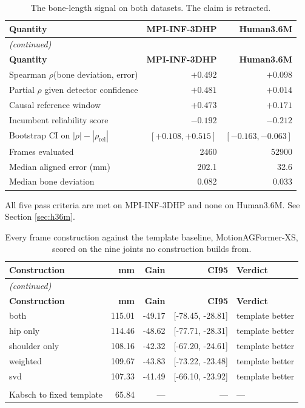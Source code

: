 \begin{center}
{\fontsize{10}{12}\selectfont
\begin{longtable}{lrr}
\caption{The bone-length signal on both datasets. The claim is retracted.}\label{tab:appbone}\\
\hline
\textbf{Quantity} & \textbf{MPI-INF-3DHP} & \textbf{Human3.6M} \\
\hline
\endfirsthead
\multicolumn{3}{l}{\textit{(continued)}}\\
\hline
\textbf{Quantity} & \textbf{MPI-INF-3DHP} & \textbf{Human3.6M} \\
\hline
\endhead
\hline
\endfoot
Spearman $\rho$(bone deviation, error) & $+0.492$ & $+0.098$ \\
Partial $\rho$ given detector confidence & $+0.481$ & $+0.014$ \\
Causal reference window & $+0.473$ & $+0.171$ \\
Incumbent reliability score & $-0.192$ & $-0.212$ \\
Bootstrap CI on $|\rho|-|\rho_{\mathrm{rel}}|$ & $[+0.108, +0.515]$ & $[-0.163, -0.063]$ \\
Frames evaluated & 2460 & 52900 \\
Median aligned error (mm) & 202.1 & 32.6 \\
Median bone deviation & 0.082 & 0.033 \\
\end{longtable}
}
\end{center}
\noindent All five pass criteria are met on MPI-INF-3DHP and none on Human3.6M. See Section \ref{sec:h36m}.

\vspace{0.6cm}

\begin{center}
{\fontsize{10}{12}\selectfont
\begin{longtable}{lrrrl}
\caption{Every frame construction against the template baseline, MotionAGFormer-XS, scored on the nine joints no construction builds from.}\label{tab:appbestframe_xs}\\
\hline
\textbf{Construction} & \textbf{mm} & \textbf{Gain} & \textbf{CI95} & \textbf{Verdict} \\
\hline
\endfirsthead
\multicolumn{5}{l}{\textit{(continued)}}\\
\hline
\textbf{Construction} & \textbf{mm} & \textbf{Gain} & \textbf{CI95} & \textbf{Verdict} \\
\hline
\endhead
\hline
\endfoot
both & 115.01 & -49.17 & [-78.45, -28.81] & template better \\
hip only & 114.46 & -48.62 & [-77.71, -28.31] & template better \\
shoulder only & 108.16 & -42.32 & [-67.20, -24.61] & template better \\
weighted & 109.67 & -43.83 & [-73.22, -23.48] & template better \\
svd & 107.33 & -41.49 & [-66.10, -23.92] & template better \\
\hline \\
Kabsch to fixed template & 65.84 & --- & --- & --- \\
\end{longtable}
}
\end{center}

